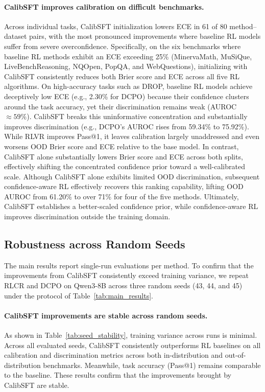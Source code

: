 \documentclass{article} %
\begin{document}
\paragraph{CalibSFT improves calibration on difficult benchmarks.}
Across individual tasks, CalibSFT initialization lowers ECE in 61 of 80 method--dataset pairs, 
with the most pronounced improvements where baseline RL models suffer from severe overconfidence. 
Specifically, on the six benchmarks where baseline RL methods 
exhibit an ECE exceeding 25\% (MinervaMath, MuSiQue, LiveBenchReasoning, NQOpen, PopQA, and WebQuestions), 
initializing with CalibSFT consistently reduces both Brier score and ECE across all five RL algorithms.
On high-accuracy tasks such as DROP, baseline RL models achieve deceptively low ECE (e.g., 2.30\% for DCPO) because their confidence clusters around the task accuracy, yet their discrimination remains weak (AUROC $\approx 59\%$).
CalibSFT breaks this uninformative concentration and substantially improves discrimination (e.g., DCPO's AUROC rises from 59.34\% to 75.92\%).
While RLVR improves Pass@1, it leaves calibration largely unaddressed and even worsens OOD Brier score and ECE relative to the base model.
In contrast, CalibSFT alone substantially lowers Brier score and ECE across both splits, effectively shifting the concentrated confidence prior toward a well-calibrated scale.
Although CalibSFT alone exhibits limited OOD discrimination, subsequent confidence-aware RL effectively recovers this ranking capability, lifting OOD AUROC from 61.20\% to over 71\% for four of the five methods.
Ultimately, CalibSFT establishes a better-scaled confidence prior, while confidence-aware RL improves discrimination outside the training domain.


\subsection{Robustness across Random Seeds}
\label{sec:seed_stability}

The main results report single-run evaluations per method. 
To confirm that the improvements from CalibSFT consistently exceed training variance, 
we repeat RLCR and DCPO on Qwen3-8B across three random seeds (43, 44, and 45) under the protocol of Table~\ref{tab:main_results}. 

\paragraph{CalibSFT improvements are stable across random seeds.}
As shown in Table~\ref{tab:seed_stability}, training variance across runs is minimal. 
Across all evaluated seeds, CalibSFT consistently outperforms RL baselines on all calibration and discrimination metrics
across both in-distribution and out-of-distribution benchmarks. 
Meanwhile, task accuracy (Pass@1) remains comparable to the baseline.
These results confirm that the improvements brought by CalibSFT are stable.
\end{document}
